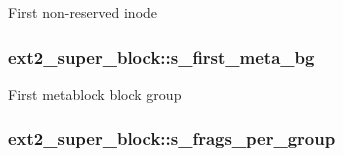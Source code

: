 First non-\/reserved inode \hypertarget{structext2__super__block_a436c7c8af548ade7f8045e88c2861d61}{
\subsubsection[{s\-\_\-first\-\_\-meta\-\_\-bg}]{ ext2\-\_\-super\-\_\-block\-::s\-\_\-first\-\_\-meta\-\_\-bg}}\label{structext2__super__block_a436c7c8af548ade7f8045e88c2861d61}
First metablock block group \hypertarget{structext2__super__block_a6370cd7307aa833951c40fcc3f941b61}{
\subsubsection[{s\-\_\-frags\-\_\-per\-\_\-group}]{ ext2\-\_\-super\-\_\-block\-::s\-\_\-frags\-\_\-per\-\_\-group}}\label{structext2__super__block_a6370cd7307aa833951c40fcc3f941b61}
